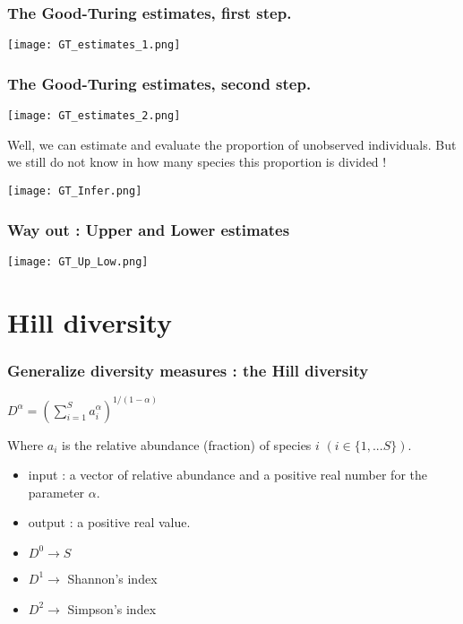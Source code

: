 \documentclass[10pt]{beamer}
\begin{document}
\begin{frame}
\frametitle{The Good-Turing estimates, first step.}
	\begin{center}
       \texttt{[image: GT\_estimates\_1.png]}
	\end{center}
\end{frame}

\begin{frame}
\frametitle{The Good-Turing estimates, second step.}
	\begin{center}
       \texttt{[image: GT\_estimates\_2.png]}
	\end{center}
\end{frame}

\begin{frame}
\begin{center}
Well, we can estimate and evaluate the proportion of unobserved individuals.
But we still do not know in how many species this proportion is divided !
\end{center}
\begin{center}
       \texttt{[image: GT\_Infer.png]}
	\end{center}
\end{frame}

\begin{frame}
\frametitle{Way out : Upper and Lower estimates}

	\begin{center}
       \texttt{[image: GT\_Up\_Low.png]}
	\end{center}
\end{frame}

\section{Hill diversity}

\begin{frame}
\frametitle{Generalize diversity measures : the Hill diversity}
\begin{center}
 $ \displaystyle D^{\alpha} =\left( \sum_{i=1}^{S} a_i^{\alpha} \right)^{1/(1-\alpha)}$
\end{center}
Where $a_i$ is the relative abundance (fraction) of species $i$ $(i\in \{1, ... S\})$.
	
\begin{itemize}
\item 	input : a vector of relative abundance and a positive real number for the parameter $\alpha$.
\item output : a positive real value.
\end{itemize}

\begin{itemize}
\item $D^0 \rightarrow S $ 
\item $D^1 \rightarrow $ Shannon's index 
\item $D^2 \rightarrow $ Simpson's index
\end{itemize}

\end{frame}
\end{document}
